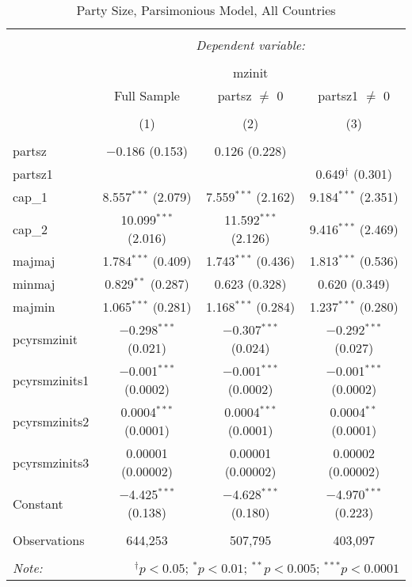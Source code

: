 
\begin{table}[!htbp] \centering 
  \caption{Party Size, Parsimonious Model, All Countries} 
  \label{} 
\begin{tabular}{@{\extracolsep{5pt}}lccc} 
\\[-1.8ex]\hline 
\hline \\[-1.8ex] 
 & \multicolumn{3}{c}{\textit{Dependent variable:}} \\ 
\cline{2-4} 
\\[-1.8ex] & \multicolumn{3}{c}{mzinit} \\ 
 & Full Sample & partsz $\neq$ 0 & partsz1 $\neq$ 0 \\ 
\\[-1.8ex] & (1) & (2) & (3)\\ 
\hline \\[-1.8ex] 
 partsz & $-$0.186 (0.153) & 0.126 (0.228) &  \\ 
  partsz1 &  &  & 0.649$^{\dagger}$ (0.301) \\ 
  cap\_1 & 8.557$^{***}$ (2.079) & 7.559$^{***}$ (2.162) & 9.184$^{***}$ (2.351) \\ 
  cap\_2 & 10.099$^{***}$ (2.016) & 11.592$^{***}$ (2.126) & 9.416$^{***}$ (2.469) \\ 
  majmaj & 1.784$^{***}$ (0.409) & 1.743$^{***}$ (0.436) & 1.813$^{***}$ (0.536) \\ 
  minmaj & 0.829$^{**}$ (0.287) & 0.623 (0.328) & 0.620 (0.349) \\ 
  majmin & 1.065$^{***}$ (0.281) & 1.168$^{***}$ (0.284) & 1.237$^{***}$ (0.280) \\ 
  pcyrsmzinit & $-$0.298$^{***}$ (0.021) & $-$0.307$^{***}$ (0.024) & $-$0.292$^{***}$ (0.027) \\ 
  pcyrsmzinits1 & $-$0.001$^{***}$ (0.0002) & $-$0.001$^{***}$ (0.0002) & $-$0.001$^{***}$ (0.0002) \\ 
  pcyrsmzinits2 & 0.0004$^{***}$ (0.0001) & 0.0004$^{***}$ (0.0001) & 0.0004$^{**}$ (0.0001) \\ 
  pcyrsmzinits3 & 0.00001 (0.00002) & 0.00001 (0.00002) & 0.00002 (0.00002) \\ 
  Constant & $-$4.425$^{***}$ (0.138) & $-$4.628$^{***}$ (0.180) & $-$4.970$^{***}$ (0.223) \\ 
 \hline \\[-1.8ex] 
Observations & 644,253 & 507,795 & 403,097 \\ 
\hline 
\hline \\[-1.8ex] 
\textit{Note:}  & \multicolumn{3}{r}{$^{\dagger} p<0.05$; $^{*} p<0.01$; $^{**} p<0.005$; $^{***} p<0.0001$} \\ 
\end{tabular} 
\end{table} 
